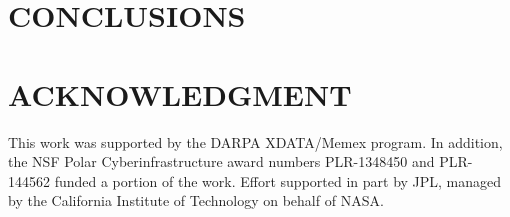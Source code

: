 \documentclass[sigconf]{acmart}
\begin{document}


\maketitle








\section{CONCLUSIONS}

\section*{ACKNOWLEDGMENT}
This work was supported by the DARPA XDATA/Memex program. In addition, the NSF Polar Cyberinfrastructure award numbers PLR-1348450 and PLR-144562 funded a portion of the work. Effort supported in part by JPL, managed by the California Institute of Technology on behalf of NASA.


 
\end{document}
